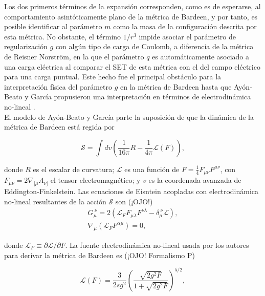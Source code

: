 \documentclass{article}
\numberwithin{equation}{section}
\theoremstyle{definition}
\begin{document}
Los dos primeros términos de la expansión corresponden, como es de esperarse, al comportamiento asintóticamente plano de la métrica de Bardeen, y por tanto, es posible identificar al parámetro $m$ como la masa de la configuración descrita por esta métrica. No obstante, el término $1/r^3$ impide asociar el parámetro  de regularización $g$ con algún tipo de carga de Coulomb, a diferencia de la métrica de Reisner Norström, en la que el parámetro $q$ es automáticamente asociado a una carga eléctrica al comparar el SET de esta métrica con el del campo eléctrico para una carga puntual. Este hecho fue el principal obstáculo para la interpretación física del parámetro $g$ en la métrica de Bardeen hasta que Ayón-Beato y García propusieron una interpretación en términos de electrodinámica no-lineal \cite{ayon-beato2000}.\\

El modelo de Ayón-Beato y García parte la suposición de que la dinámica de la métrica de Bardeen está regida por

\begin{equation}
\mathcal{S} = \int dv \left( \frac{1}{16 \pi}R - \frac{1}{4 \pi}\mathcal{L}(F) \right),
\end{equation}

donde $R$ es el escalar de curvatura; $\mathcal{L}$ es una función de $F = \frac{1}{4}F_{\mu \nu}F^{\mu \nu}$, con $F_{\mu \nu} = 2\nabla_{[\mu}A_{\nu]}$ el tensor electromagnético; y $v$ es la coordenada avanzada de Eddington-Finkelstein. Las ecuaciones de Eisntein acopladas con electrodinámica no-lineal resultantes de la acción $\mathcal{S}$ son (¡OJO!)\\

\begin{equation}
\label{euler lagrange eqns}
\begin{aligned}
G_{\mu}^{\ \nu} = 2(\mathcal{L}_{F} F_{\mu \lambda} F^{\nu \lambda} - \delta_{\mu}^{\ \nu} \mathcal{L}),\\
\nabla_{\mu}(\mathcal{L}_{F} F^{\alpha \mu}) = 0,
\end{aligned}
\end{equation}

donde $\mathcal{L}_{F} \equiv \partial \mathcal{L}/\partial F$. La fuente electrodinámica no-lineal usada por los autores para derivar la métrica de Bardeen es (¡OJO! Formalismo P)

\begin{equation}
\label{nonlinear bardeen}
\mathcal{L}(F) = \frac{3}{2sg^2}\left( \frac{\sqrt{2g^2F}}{1 + \sqrt{2g^2F}} \right)^{5/2},
\end{equation}
\end{document}
